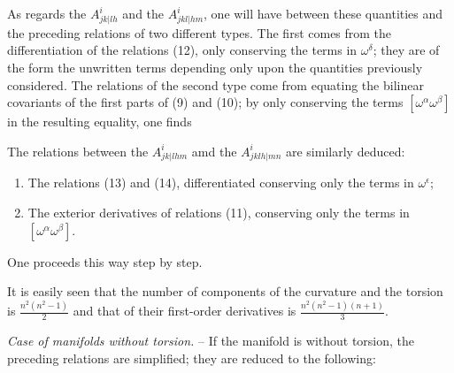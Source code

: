 As regards the $A_{jk|lh}^i$ and the $A_{jkl|hm}^i$, one will have between these quantities and the preceding relations of two different types. The first comes from the differentiation of the relations (12), only conserving the terms in $\omega^\delta$; they are of the form
the unwritten terms depending only upon the quantities previously considered. The relations of the second type come from equating the bilinear covariants of the first parts of (9) and (10); by only conserving the terms $[\omega^\alpha \omega^\beta]$ in the resulting equality, one finds

The relations between the $A_{jk|lhm}^i$ amd the $A_{jklh|mn}^i$ are similarly deduced:
\begin{enumerate}
\item The relations (13) and (14), differentiated conserving only the terms in $\omega^\epsilon$;
\item The exterior derivatives of relations (11), conserving only the terms in $[\omega^\alpha \omega^\beta]$.
\end{enumerate}

One proceeds this way step by step.

It is easily seen that the number of components of the curvature and the torsion is $\frac{n^2(n^2-1)}{2}$ and that of their first-order derivatives is $\frac{n^2(n^2-1)(n+1)}{3}$.

\textit{Case of manifolds without torsion.} -- If the manifold is without torsion, the preceding relations are simplified; they are reduced to the following:
